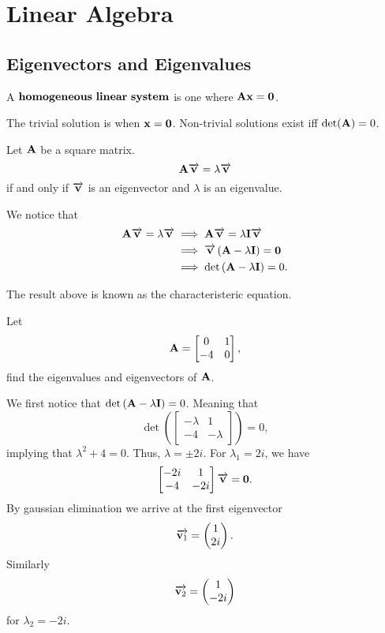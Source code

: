 \chapter{Linear Algebra}
\section{Eigenvectors and Eigenvalues}
\begin{definition}
    A $\bold{homogeneous ~linear ~ system}$ is one where $\bold{Ax} = \bold{0}$.
\end{definition}

\noindent{}The trivial solution is when $\bold{x} = \bold{0}$. Non-trivial solutions exist iff $\det(\bold{A}) = 0$.

\begin{theorem}
    Let $\bold{A}$ be a square matrix. $$\bold{A\overrightarrow{\bold{v}}} = \lambda \overrightarrow{\bold{v}}$$
    if and only if $\overrightarrow{\bold{v}}$ is an eigenvector and $\lambda$ is an eigenvalue.
\end{theorem}

We notice that 
\begin{align*}
    \bold{A}\overrightarrow{\bold{v}} = \lambda\overrightarrow{\bold{v}} &\implies \bold{A}\overrightarrow{\bold{v}} = \lambda \bold{I} \overrightarrow{\bold{v}} \\
    &\implies \overrightarrow{\bold{v}} \left(\bold{A} - \lambda \bold{I} \right) = \bold{0} \\
    &\implies \det \left(\bold{A} - \lambda \bold{I} \right) = 0.
\end{align*}

The result above is known as the \alert{characteristeric equation}.

\begin{example}
    Let $$\bold{A} = \begin{bmatrix} 0 & 1 \\ -4 & 0 \end{bmatrix},$$
    find the eigenvalues and eigenvectors of $\bold{A}$.
\end{example}

\noindent{}We first notice that $\det \left(\bold{A} - \lambda \bold{I}\right) = 0$. Meaning that
$$\det \left(\begin{bmatrix} -\lambda & 1 \\ -4 & -\lambda \end{bmatrix}\right) = 0,$$
implying that $\lambda^2+4 = 0$. Thus, $\lambda = \pm 2i$. For $\lambda_1 = 2i$, we have
$$\begin{bmatrix} -2i & 1 \\ -4 & -2i \end{bmatrix} \overrightarrow{\bold{v}} = \bold{0}.$$
By gaussian elimination we arrive at the first eigenvector $$\overrightarrow{\bold{v}_1} = \begin{pmatrix} 1 \\ 2i \end{pmatrix}.$$ Similarly $$\overrightarrow{\bold{v}_2} = \begin{pmatrix} 1 \\ -2i \end{pmatrix}$$ for $\lambda_2 = -2i$.

